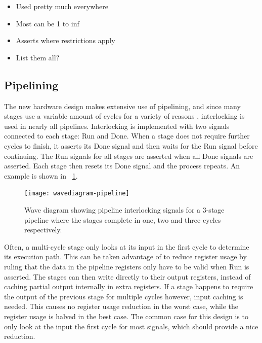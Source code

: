\begin{itemize}
    \item Used pretty much everywhere
    \item Most can be 1 to inf
    \item Asserts where restrictions apply
    \item List them all?
\end{itemize}

\subsection{Pipelining}

The new hardware design makes extensive use of pipelining, and since many stages use a variable amount of cycles for a variety of reasons , interlocking is used in nearly all pipelines.
Interlocking is implemented with two signals connected to each stage: Run and Done.
When a stage does not require further cycles to finish, it asserts its Done signal and then waits for the Run signal before continuing.
The Run signals for all stages are asserted when all Done signals are asserted.
Each stage then resets its Done signal and the process repeats.
An example is shown in \figurename~\ref{fig:wavediagram-pipeline}.

\begin{figure}[!ht]
    \centering
    \texttt{[image: wavediagram-pipeline]}
    \caption[Pipeline wave diagram]{
        Wave diagram showing pipeline interlocking signals for a 3-stage pipeline where the stages complete in one, two and three cycles respectively.
    }
    \label{fig:wavediagram-pipeline}
\end{figure}

Often, a multi-cycle stage only looks at its input in the first cycle to determine its execution path.
This can be taken advantage of to reduce register usage by ruling that the data in the pipeline registers only have to be valid when Run is asserted.
The stages can then write directly to their output registers, instead of caching partial output internally in extra registers.
If a stage happens to require the output of the previous stage for multiple cycles however, input caching is needed.
This causes no register usage reduction in the worst case, while the register usage is halved in the best case.
The common case for this design is to only look at the input the first cycle for most signals, which should provide a nice reduction.

